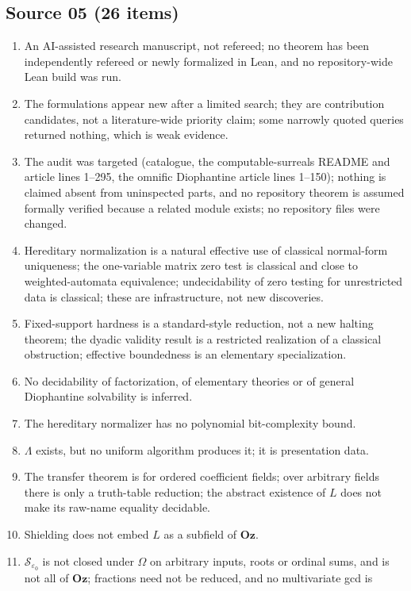 \documentclass[11pt,oneside]{article}
\numberwithin{equation}{section}
\theoremstyle{definition}
\theoremstyle{remark}
\newcommand{\Oz}{\mathbf{Oz}}
\newcommand{\SE}{\mathcal S_{\varepsilon_0}}
\newcommand{\Om}{\Omega}
\begin{document}
\subsection{Source 05 (26 items)}
\begin{enumerate}[leftmargin=*,widest=00,label=05.\arabic*]
\item An AI-assisted research manuscript, not refereed; no theorem has been
independently refereed or newly formalized in Lean, and no repository-wide Lean
build was run.
\item The formulations appear new after a limited search; they are contribution
candidates, not a literature-wide priority claim; some narrowly quoted queries
returned nothing, which is weak evidence.
\item The audit was targeted (catalogue, the computable-surreals README and article
lines 1--295, the omnific Diophantine article lines 1--150); nothing is claimed
absent from uninspected parts, and no repository theorem is assumed formally
verified because a related module exists; no repository files were changed.
\item Hereditary normalization is a natural effective use of classical
normal-form uniqueness; the one-variable matrix zero test is classical and close to
weighted-automata equivalence; undecidability of zero testing for unrestricted data
is classical; these are infrastructure, not new discoveries.
\item Fixed-support hardness is a standard-style reduction, not a new halting
theorem; the dyadic validity result is a restricted realization of a classical
obstruction; effective boundedness is an elementary specialization.
\item No decidability of factorization, of elementary theories or of general
Diophantine solvability is inferred.
\item The hereditary normalizer has no polynomial bit-complexity bound.
\item $\Lambda$ exists, but no uniform algorithm produces it; it is presentation
data.
\item The transfer theorem is for ordered coefficient fields; over arbitrary fields
there is only a truth-table reduction; the abstract existence of $L$ does not make
its raw-name equality decidable.
\item Shielding does not embed $L$ as a subfield of $\Oz$.
\item $\SE$ is not closed under $\Om$ on arbitrary inputs, roots or ordinal sums,
and is not all of $\Oz$; fractions need not be reduced, and no multivariate gcd is

\end{enumerate}
\end{document}
